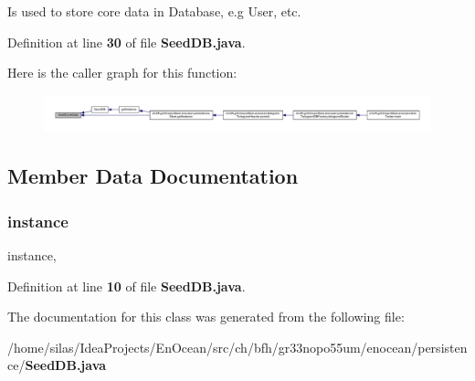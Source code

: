 Is used to store core data in Database, e.\+g User, etc. 



Definition at line {\bf 30} of file {\bf Seed\+D\+B.\+java}.

Here is the caller graph for this function\+:\nopagebreak
\begin{figure}[H]
\begin{center}
\leavevmode
\includegraphics[width=350pt]{d6/ddb/classch_1_1bfh_1_1gr33nopo55um_1_1enocean_1_1persistence_1_1SeedDB_ad36fadbd4266f56a9ee31c9d948ffd51_icgraph}
\end{center}
\end{figure}


\subsection{Member Data Documentation}
\label{classch_1_1bfh_1_1gr33nopo55um_1_1enocean_1_1persistence_1_1SeedDB_a022d3596ac9b3704dd158b5104e3ad2c} 
\subsubsection{instance}
{\footnotesize{} instance\hspace{0.3cm}{\ttfamily [static]}, {\ttfamily [private]}}



Definition at line {\bf 10} of file {\bf Seed\+D\+B.\+java}.



The documentation for this class was generated from the following file\+:\begin{DoxyCompactItemize}
\item 
/home/silas/\+Idea\+Projects/\+En\+Ocean/src/ch/bfh/gr33nopo55um/enocean/persistence/{\bf Seed\+D\+B.\+java}\end{DoxyCompactItemize}
